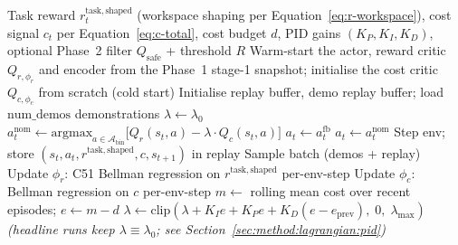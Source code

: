 \documentclass[11pt,a4paper]{report}
\begin{document}
\begin{algorithm}[h]
\caption{Value-based Lagrangian constrained-RL training loop
(headline: Option~B-value-mean).}
\label{alg:constrained-rl}
\begin{algorithmic}[1]
\Require Task reward $r^{\mathrm{task,shaped}}_t$ (workspace shaping
  per Equation~\ref{eq:r-workspace}), cost signal $c_t$ per
  Equation~\ref{eq:c-total}, cost budget $d$, PID gains
  $(K_P, K_I, K_D)$, optional Phase~2 filter $Q_{\mathrm{safe}}$ +
  threshold $R$
\State Warm-start the actor, reward critic $Q_{r,\phi_r}$ and
  encoder from the Phase~1 stage-1 snapshot; initialise the cost
  critic $Q_{c,\phi_c}$ from scratch (cold start)
\State Initialise replay buffer, demo replay buffer; load
  $\text{num\_demos}$ demonstrations
\State $\lambda \leftarrow \lambda_0$ 
  \State $a^{\mathrm{nom}}_t \leftarrow \mathrm{argmax}_{a \in
  \mathcal{A}_{\mathrm{bin}}}\!\big[Q_r(s_t,a) - \lambda \cdot
  Q_c(s_t,a)\big]$
    \State $a_t \leftarrow a^{\mathrm{fb}}_t$ 
  \Else
    \State $a_t \leftarrow a^{\mathrm{nom}}_t$
  \EndIf
  \State Step env; store $(s_t, a_t, r^{\mathrm{task,shaped}}, c,
    s_{t+1})$ in replay
  \State Sample batch (demos + replay)
  \State Update $\phi_r$: C51 Bellman regression on
    $r^{\mathrm{task,shaped}}$ per-env-step
  \State Update $\phi_c$: Bellman regression on $c$ per-env-step
    \State $m \leftarrow$ rolling mean cost over recent episodes;
      \quad $e \leftarrow m - d$
    \State $\lambda \leftarrow \mathrm{clip}(\lambda + K_I e
      + K_P e + K_D (e - e_{\mathrm{prev}}),\; 0,\; \lambda_{\max})$
  \EndIf
  \Statex \hspace{\algorithmicindent}\textit{(headline runs keep
    $\lambda \equiv \lambda_0$; see
    Section~\ref{sec:method:lagrangian:pid})}
\EndFor
\end{algorithmic}
\end{algorithm}


\end{document}
